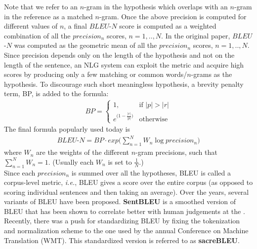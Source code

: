Note that we refer to an $n$-gram in the hypothesis which overlaps with an $n$-gram in the reference as a matched $n$-gram.
Once the above precision is computed for different values of $n$, a final $BLEU$-$N$ score is computed as a weighted combination of all the $precision_n$ scores, $ n = 1,..,N$. In the original paper, $BLEU$-$N$  was computed as the geometric mean of all the $precision_n$ scores, $ n = 1,..,N$.
Since precision depends only on the length of the hypothesis and not on the length of the sentence, an NLG system can exploit the metric and acquire high scores by producing only a few matching or common words/$n$-grams as the hypothesis. To discourage such short meaningless hypothesis, a brevity penalty term, BP, is added to the formula:
\begin{align*}
    BP = 
    \begin{cases}
     1, & \text{if } |p|>|r| \\
     e^{\big(1-\frac{|r|}{|p|}\big)} & \text{otherwise}
    \end{cases}
\end{align*}
The final formula popularly used today is 
\begin{align*}
    BLEU\text{-}N= BP\cdot exp\bigg(\sum_{n=1}^N W_n\log precision_n \bigg)
\end{align*}
where $W_n$ are the weights of the different $n$-gram precisions, such that $\sum_{n=1}^N W_n = 1$. (Usually each $W_n$ is set to $\frac{1}{N}$.)\\
Since each $precision_n$ is summed over all the hypotheses, BLEU is called a corpus-level metric, \textit{i.e.}, BLEU gives a score over the entire corpus (as opposed to scoring individual sentences and then taking an average). Over the years, several variants of BLEU have been proposed. \textbf{SentBLEU} is a smoothed version of BLEU that has been shown to correlate better with human judgements at the .  Recently, there was a push for standardizing BLEU  by fixing the tokenization and normalization scheme to the one used by the annual Conference on Machine Translation (WMT). This standardized version is referred to as \textbf{sacreBLEU}. 
